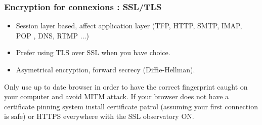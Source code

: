 \begin{frame}
\frametitle{Encryption for connexions : SSL/TLS}
\begin{itemize}
\item Session layer based, affect application layer (TFP, HTTP, SMTP, IMAP, POP
, DNS, RTMP ...)
\item Prefer using TLS over SSL when you have choice.
\item Asymetrical encryption, forward secrecy (Diffie-Hellman).
\end{itemize}

Only use up to date browser in order to have the correct fingerprint caught
on your computer and avoid MITM attack.
If your browser does not have a certificate pinning system install
certificate patrol (assuming your first connection is safe) or HTTPS everywhere
with the SSL observatory ON.
\end{frame}

